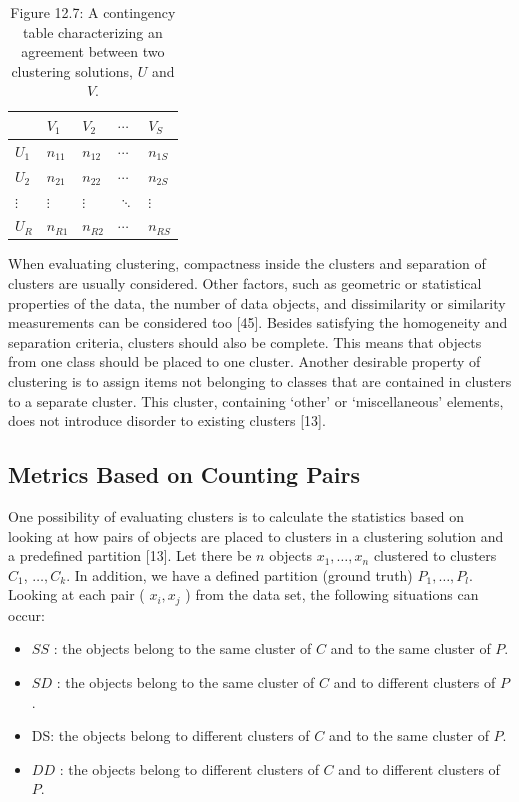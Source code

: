 \documentclass[11pt,openany,executivepaper]{book}
\begin{document}
\begin{table}[h]
\begin{center}
\begin{tabular}{l|llll}
 & $V_{1}$ & $V_{2}$ & $\cdots$ & $V_{S}$ \\
\hline
$U_{1}$ & $n_{11}$ & $n_{12}$ & $\cdots$ & $n_{1 S}$ \\
$U_{2}$ & $n_{21}$ & $n_{22}$ & $\cdots$ & $n_{2 S}$ \\
$\vdots$ & $\vdots$ & $\vdots$ & $\ddots$ & $\vdots$ \\
$U_{R}$ & $n_{R 1}$ & $n_{R 2}$ & $\cdots$ & $n_{R S}$ \\
\end{tabular}
\captionsetup{labelformat=empty}
\caption{Figure 12.7: A contingency table characterizing an agreement between two clustering solutions, $U$ and $V$.}
\end{center}
\end{table}

When evaluating clustering, compactness inside the clusters and separation
of clusters are usually considered. Other factors, such as geometric or statistical properties of the data, the number of data objects, and dissimilarity or similarity measurements can be considered too [45]. Besides satisfying the homogeneity and separation criteria, clusters should also be complete. This means that objects from one class should be placed to one cluster. Another desirable property of clustering is to assign items not belonging to classes that are contained in clusters to a separate cluster. This cluster, containing ‘other’ or ‘miscellaneous’ elements, does not introduce disorder to existing clusters [13].

\subsection*{Metrics Based on Counting Pairs}
One possibility of evaluating clusters is to calculate the statistics based on looking at how pairs of objects are placed to clusters in a clustering solution and a predefined partition [13]. Let there be $n$ objects $x_{1}, \ldots, x_{n}$ clustered to clusters $C_{1}$, $\ldots, C_{k}$. In addition, we have a defined partition (ground truth) $P_{1}, \ldots, P_{l}$. Looking at each pair ( $x_{i}, x_{j}$ ) from the data set, the following situations can occur:

\begin{itemize}
  \item $S S$ : the objects belong to the same cluster of $C$ and to the same cluster of $P$.
  \item $S D$ : the objects belong to the same cluster of $C$ and to different clusters of $P$.
  \item DS: the objects belong to different clusters of $C$ and to the same cluster of $P$.
  \item $D D$ : the objects belong to different clusters of $C$ and to different clusters of $P$.\\
\end{itemize}
\end{document}
